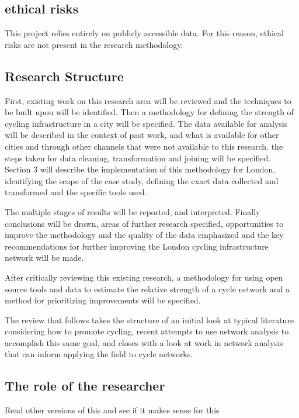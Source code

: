 \subsection{ethical risks}

This project relies entirely on publicly accessible data. For this reason, ethical risks are not present in the research methodology.  

\subsection{Research Structure}

First, existing work on this research area will be reviewed and the techniques to be built upon will be identified.  Then a methodology for defining the strength of cycling infrastructure in a city will be specified. The data available for analysis will be described in the context of past work, and what is available for other cities and through other channels that were not available to this research. the steps taken for data cleaning, transformation and joining will be specified. Section 3 will describe the implementation of this methodology for London, identifying the scope of the case study, defining the exact data collected and transformed and the specific tools used. 

The multiple stages of results will be reported, and interpreted. Finally conclusions will be drawn, areas of further research specified, opportunities to improve the methodology and the quality of the data emphasized and the key recommendations for further improving the London cycling infrastructure network will be made. 

After critically reviewing this existing research, a methodology for using open source tools and data to estimate the relative strength of a cycle network and a method for prioritizing improvements will be specified.

The review that follows takes the structure of an initial look at typical literature considering how to promote cycling, recent attempts to use network analysis to accomplish this same goal, and closes with a look at work in network analysis that can inform applying the field to cycle networks.

\subsection{The role of the researcher}

Read other versions of this and see if it makes sense for this 


